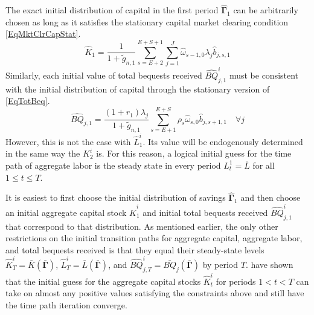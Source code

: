 \documentclass[letterpaper,12pt]{article}
\theoremstyle{definition}
\begin{document}
  The exact initial distribution of capital in the first period $\bm{\hat{\Gamma}}_1$ can be arbitrarily chosen as long as it satisfies the stationary capital market clearing condition \eqref{EqMktClrCapStat}.
  \begin{equation}\label{EqMktClrCapStat1}
    \hat{K}_1 = \frac{1}{1 + \tilde{g}_{n,1}}\sum_{s=E+2}^{E+S+1}\sum_{j=1}^{J}\hat{\omega}_{s-1,0}\lambda_j \hat{b}_{j,s,1}
  \end{equation}
  Similarly, each initial value of total bequests received $\hat{BQ}_{j,1}^i$ must be consistent with the initial distribution of capital through the stationary version of \eqref{EqTotBeq}.
  \begin{equation}\label{EqTotBeqStat1}
    \hat{BQ}_{j,1} = \frac{(1+r_1)\lambda_j}{1+\tilde{g}_{n,1}}\sum_{s=E+1}^{E+S}\rho_s\hat{\omega}_{s,0}\hat{b}_{j,s+1,1} \quad\forall j
  \end{equation}
  However, this is not the case with $\hat{L}_1^i$. Its value will be endogenously determined in the same way the $K_2^i$ is. For this reason, a logical initial guess for the time path of aggregate labor is the steady state in every period $L_t^1 = \bar{L}$ for all $1\leq t\leq T$.

  It is easiest to first choose the initial distribution of savings $\bm{\hat{\Gamma}}_1$ and then choose an initial aggregate capital stock $\hat{K}_1^i$ and initial total bequests received $\hat{BQ}_{j,1}^i$ that correspond to that distribution. As mentioned earlier, the only other restrictions on the initial transition paths for aggregate capital, aggregate labor, and total bequests received is that they equal their steady-state levels $\hat{K}_T^i = \bar{K}\left(\bm{\bar{\Gamma}}\right)$, $\hat{L}_T^i = \bar{L}\left(\bm{\bar{\Gamma}}\right)$, and $\hat{BQ}_{j,T}^i = \bar{BQ}_j\left(\bm{\bar{\Gamma}}\right)$ by period $T$. \citet{EvansPhillips:2014} have shown that the initial guess for the aggregate capital stocks $\hat{K}_t^i$ for periods $1<t<T$ can take on almost any positive values satisfying the constraints above and still have the time path iteration converge.
\end{document}
